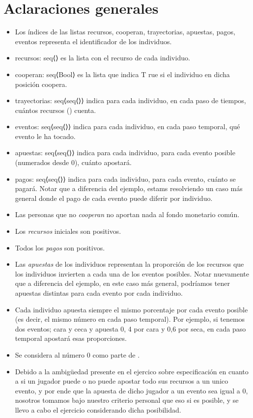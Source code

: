 \documentclass[10pt,a4paper]{article}
\begin{document}
\maketitle

\section{Aclaraciones generales} 


\begin{itemize}
	\item Los índices de las listas recursos, cooperan, trayectorias, apuestas, pagos, eventos representa el identificador de los
    individuos.
	\item recursos: seq⟨\real⟩ es la lista con el recurso de cada individuo.
	\item cooperan: seq⟨Bool⟩ es la lista que indica T rue si el individuo en dicha posición coopera.
	\item trayectorias: seq⟨seq⟨\real⟩⟩ indica para cada individuo, en cada paso de tiempos, cuántos recursos (\real) cuenta.
	\item eventos: seq⟨seq⟨\nat⟩⟩ indica para cada individuo, en cada paso temporal, qué evento le ha tocado.
	\item apuestas: seq⟨seq⟨\real⟩⟩ indica para cada individuo, para cada evento posible (numerados desde 0), cuánto apostará.
	\item pagos: seq⟨seq⟨\real⟩⟩ indica para cada individuo, para cada evento, cuánto se pagará. Notar que a diferencia del ejemplo, estams resolviendo un caso más general donde el pago de cada evento puede diferir por individuo.
	\item Las personas que no \textit{cooperan} no aportan nada al fondo monetario común.
	\item Los \textit{recursos} iniciales son positivos.
	\item Todos los \textit{pagos} son positivos.
	\item Las \textit{apuestas} de los individuos representan la proporción de los recursos que los individuos invierten a cada una de los eventos posibles. Notar nuevamente que a diferencia del ejemplo, en este caso más general, podríamos tener apuestas distintas para cada evento por cada individuo.
	\item Cada individuo apuesta siempre el mismo porcentaje por cada evento posible (es decir, el mismo número en cada paso temporal). Por ejemplo, si tenemos dos eventos; cara y ceca y apuesta 0, 4 por cara y 0,6 por seca, en cada paso temporal apostará esas proporciones.
    \item Se considera al número 0 como parte de \nat.
    \item Debido a la ambigüedad presente en el ejercico sobre especificación en cuanto a si un jugador puede o no puede apostar todo sus recursos a un unico evento, y por ende que la apuesta de dicho jugador a un evento sea igual a 0,  nosotros tomamos bajo nuestro criterio personal que eso si es posible, y se llevo a cabo el ejercicio considerando dicha posibilidad.
    
\end{itemize}
\end{document}
